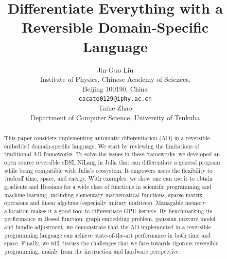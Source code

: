 \documentclass{article}
\newcommand{\<}{\langle}
\renewcommand{\>}{\rangle}
\theoremstyle{definition}\newtheorem{definition}{\textit{Definition}}
\begin{document}
\title{Differentiate Everything with a Reversible Domain-Specific Language}

\author{Jin-Guo Liu\\
Institute of Physics, Chinese Academy of Sciences,\\Beijing 100190, China\\
\texttt{cacate0129@iphy.ac.cn}\\
\And
Taine Zhao\\
Department of Computer Science, University of Tsukuba\\
}



\maketitle

\begin{abstract}
    This paper considers implementing automatic differentiation (AD) in a reversible embedded domain-specific language. We start by reviewing the limitations of traditional AD frameworks. To solve the issues in these frameworks, we developed an open source reversible eDSL NiLang in Julia that can differentiate a general program while being compatible with Julia's ecosystem. It empowers users the flexibility to tradeoff time, space, and energy. With examples, we show one can use it to obtain gradients and Hessians for a wide class of functions in scientific programming and machine learning, including elementary mathematical functions, sparse matrix operaions and linear algebras (especially unitary matrices). Managable memory allocation makes it a good tool to differentiate GPU kernels.
By benchmarking its performance in Bessel function, graph embedding problem, gaussian mixture model and bundle adjustment, we demonstrate that the AD implemneted in a reversible programming language can achieve state-of-the-art performance in both time and space. Finally, we will discuss the challenges that we face towards rigorous reversible programming, mainly from the instruction and hardware perspective.
\end{abstract}
\end{document}

